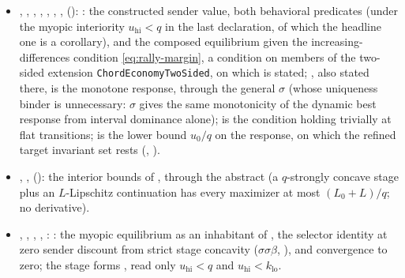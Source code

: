 \begin{itemize}[leftmargin=1.4em,itemsep=1pt]
\texttt{hFcs}, condition (T6) of ; its members are \texttt{placableAffineCs} ($0$) and \texttt{placableQuadDiagCs} ($1/5$), and only the sender-only case and the theorem on the four cases are stated over it.
\item {}, , , , , , ,  (): : the constructed sender value, both behavioral predicates (under the myopic interiority $u_{\mathrm{hi}}<q$ in the last declaration, of which the headline one is a corollary), and the composed equilibrium given the increasing-differences condition \eqref{eq:rally-margin}, a condition on members of the two-sided extension \texttt{ChordEconomyTwoSided}, on which  is stated; , also stated there, is the monotone response, through the general $\sigma$ (whose uniqueness binder is unnecessary: $\sigma$ gives the same monotonicity of the dynamic best response from interval dominance alone);  is the condition holding trivially at flat transitions;  is the lower bound $u_0/q$ on the response, on which the refined target invariant set rests (, ).
\item {}, ,  (): the interior bounds of , through the abstract  (a $q$-strongly concave stage plus an $L$-Lipschitz continuation has every maximizer at most $(L_0+L)/q$; no derivative).
\item {}, , , , : : the myopic equilibrium as an inhabitant of , the selector identity at zero sender discount from strict stage concavity ($\sigma$$\sigma$$\beta$, ), and convergence to zero; the stage forms ,  read only $u_{\mathrm{hi}}<q$ and $u_{\mathrm{hi}}<k_{\mathrm{lo}}$.

\end{itemize}
